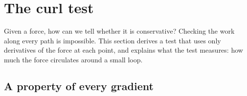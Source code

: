 \section{The curl test}
\label{sec:en-curl}

Given a force, how can we tell whether it is conservative? Checking the
work along every path is impossible. This section derives a test that
uses only derivatives of the force at each point, and explains what the
test measures: how much the force circulates around a small loop.

\subsection*{A property of every gradient}

